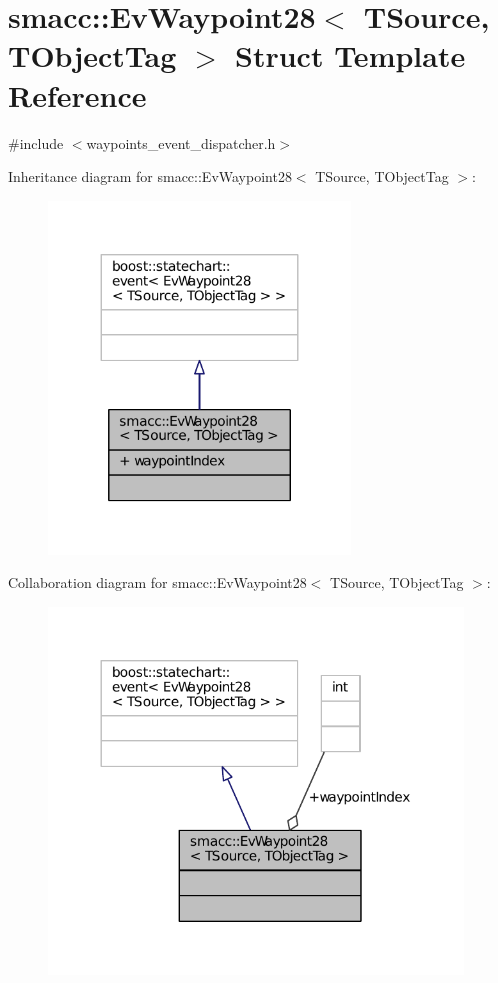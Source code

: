 \hypertarget{structsmacc_1_1EvWaypoint28}{}\section{smacc\+:\+:Ev\+Waypoint28$<$ T\+Source, T\+Object\+Tag $>$ Struct Template Reference}
\label{structsmacc_1_1EvWaypoint28}


{\ttfamily \#include $<$waypoints\+\_\+event\+\_\+dispatcher.\+h$>$}



Inheritance diagram for smacc\+:\+:Ev\+Waypoint28$<$ T\+Source, T\+Object\+Tag $>$\+:
\nopagebreak
\begin{figure}[H]
\begin{center}
\leavevmode
\includegraphics[width=227pt]{structsmacc_1_1EvWaypoint28__inherit__graph}
\end{center}
\end{figure}


Collaboration diagram for smacc\+:\+:Ev\+Waypoint28$<$ T\+Source, T\+Object\+Tag $>$\+:
\nopagebreak
\begin{figure}[H]
\begin{center}
\leavevmode
\includegraphics[width=312pt]{structsmacc_1_1EvWaypoint28__coll__graph}
\end{center}
\end{figure}
